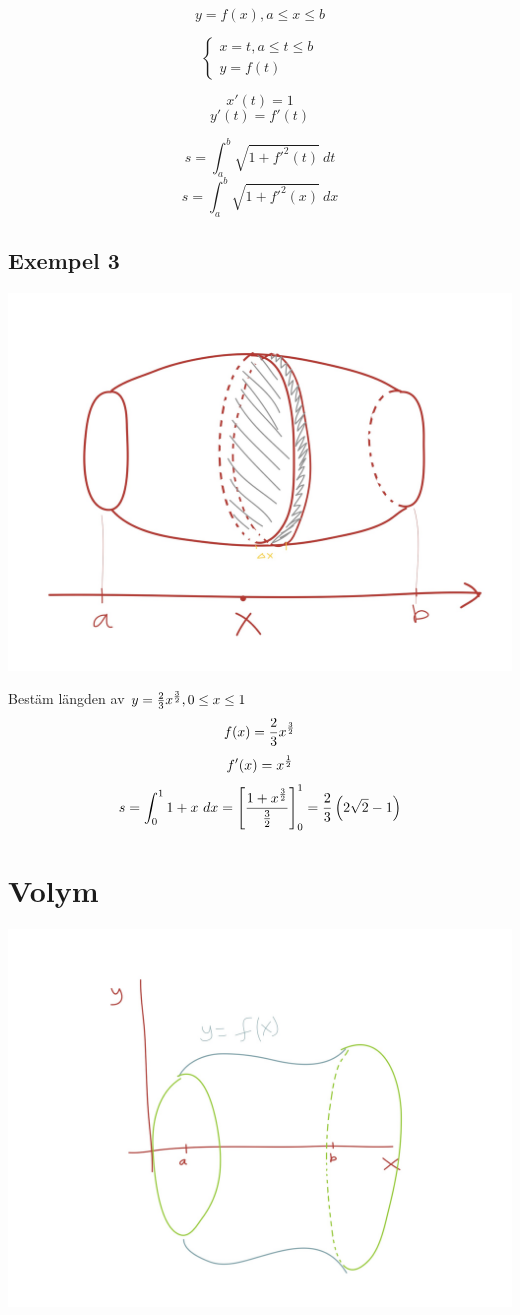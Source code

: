 \documentclass{article}
\begin{document}
$$ y = f(x), a\le x \le b $$

$$\begin{cases}
x=t, a\le t\le b\\
y=f(t)
\end{cases}$$

$$x'(t)=1 $$
$$y'(t)=f'(t)$$

$$ s=\int^b_a{\sqrt{1+f'^2(t)}\ dt} $$
$$ s=\int^b_a{\sqrt{1+f'^2(x)}\ dx} $$

\subsection{Exempel 3}

\includegraphics[scale=0.15]{img/img13.jpg}

Bestäm längden av $y=\frac{2}{3} x^{\frac{3}{2}}, 0\le x\le 1$
$$f(x) = \frac{2}{3} x^{\frac{3}{2}}$$
$$f'(x) = x^{\frac{1}{2}} $$
$$ s=\int^1_0{1+x\ dx} = \left[\frac{{1+x}^{\frac{3}{2}}}{\frac{3}{2}}\right]^1_0 = \frac{2}{3} \left(2\sqrt{2} - 1\right) $$

\section{Volym}

\includegraphics[scale=0.15]{img/img14.jpg}
\end{document}
